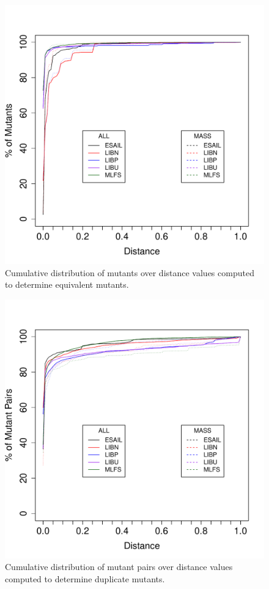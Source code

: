 \begin{figure}[tb]
\begin{center}
\includegraphics[width=0.6\columnwidth]{data/distanceFequency_Equivalent.pdf}
\caption{Cumulative distribution of mutants over distance values computed to determine equivalent mutants.}
\label{fig:results:test:dde}
\end{center}
\end{figure}

\begin{figure}[tb]
\begin{center}
\includegraphics[width=0.6\columnwidth]{data/distanceFequency_Redundant.pdf}
\caption{Cumulative distribution of mutant pairs over distance values computed to determine duplicate mutants.}
\label{fig:results:test:ddd}
\end{center}
\end{figure}



